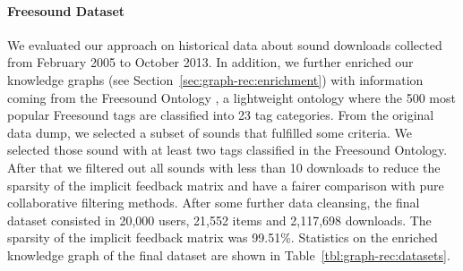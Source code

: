 \paragraph*{\textbf{Freesound Dataset}}\label{fs_dataset}
We evaluated our approach on historical data about sound downloads collected from February 2005 to October 2013. In addition, we further enriched our knowledge graphs (see Section~\ref{sec:graph-rec:enrichment}) with information coming from the Freesound Ontology \citep[chapter 6]{font2015tag}, a lightweight ontology where the 500 most popular Freesound tags are classified into 23 tag categories. From the original data dump, we selected a subset of sounds that fulfilled some criteria. We selected those sound with at least two tags classified in the Freesound Ontology. After that we filtered out all sounds with less than 10 downloads to reduce the sparsity of the implicit feedback matrix and have a fairer comparison with pure collaborative filtering methods. 
After some further data cleansing, the final dataset consisted in 20,000 users, 21,552 items and 2,117,698 downloads.%
The sparsity of the implicit feedback matrix was 99.51\%. Statistics on the enriched knowledge graph of the final dataset are shown in Table~\ref{tbl:graph-rec:datasets}.


